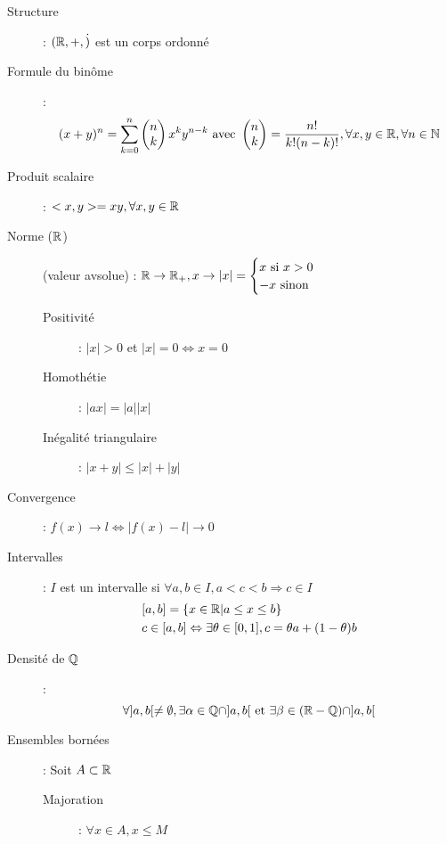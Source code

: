 \begin{description}
\item[Structure] : $(\mathbb{R},+,\dot)$ est un corps ordonné
\item[Formule du binôme] : 
    \[
        (x+y)^n=\sum_{k=0}^n
        \begin{pmatrix}
            n \\
            k
        \end{pmatrix}
        x^ky^{n-k}
        \textrm{ avec }
        \begin{pmatrix}
            n \\
            k
        \end{pmatrix}
        = \frac{n!}{k!(n-k)!}, \forall x,y\in\mathbb{R}, \forall n\in\mathbb{N}
    \]
\item[Produit scalaire] : $<x,y>=xy, \forall x,y\in\mathbb{R}$
\item[Norme ($\mathbb{R}$)] (valeur avsolue) : $\mathbb{R}\rightarrow\mathbb{R}_+,x\rightarrow
    |x|=\begin{cases}
        x\textrm{ si }x>0 \\
        -x\textrm{ sinon}
    \end{cases}$
    \begin{description}
        \item[Positivité] : $|x|>0$ et $|x|=0\Leftrightarrow x=0$
        \item[Homothétie] : $|ax|=|a||x|$
        \item[Inégalité triangulaire] : $|x+y|\le |x|+|y|$
    \end{description}
\item[Convergence] : $f(x)\longrightarrow l\Leftrightarrow |f(x)-l|\longrightarrow 0$
\item[Intervalles] : $I$ est un intervalle si $\forall a,b\in I, a<c<b\Rightarrow c\in I$
    \[
        \begin{split}
            & [a,b]=\{x\in\mathbb{R} | a\le x\le b\}\\
            & c\in[a,b]\Leftrightarrow\exists\theta\in[0,1],
            c=\theta a+(1-\theta)b
        \end{split}
    \]
\item[Densité de $\mathbb{Q}$] : 
    \[
        \forall]a,b[\ne\emptyset,
        \exists\alpha\in\mathbb{Q}\cap]a,b[
        \textrm{ et }
        \exists\beta\in(\mathbb{R}-\mathbb{Q})\cap]a,b[
    \]
\item[Ensembles bornées] : Soit $A\subset\mathbb{R}$
        \begin{description}
        \item[Majoration] : $\forall x\in A, x\le M$

\end{description}
\end{description}
